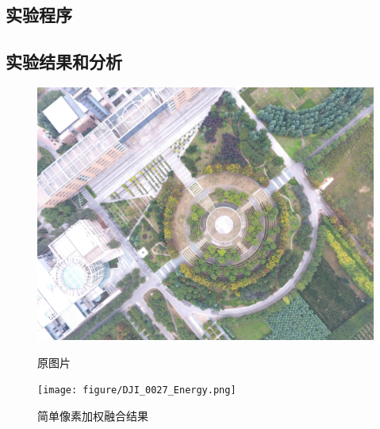 \subsection{实验程序}


\subsection{实验结果和分析}
\begin{figure}[H]
	\centering	
	\begin{minipage}{0.45\linewidth}
		\includegraphics[width=\linewidth]{figure/DJI_0027_Compressed.png}
		\caption{原图片}
	\end{minipage}
	\begin{minipage}{0.45\linewidth}
		\texttt{[image: figure/DJI\_0027\_Energy.png]}
		\caption{简单像素加权融合结果}
	\end{minipage}

\end{figure}